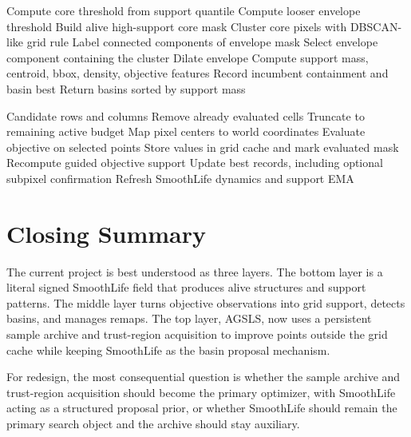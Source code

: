 \documentclass[11pt]{article}
\begin{document}
\begin{algorithm}
\caption{Current basin detection}
\begin{algorithmic}[1]
\State Compute core threshold from support quantile
\State Compute looser envelope threshold
\State Build alive high-support core mask
\State Cluster core pixels with DBSCAN-like grid rule
\State Label connected components of envelope mask
    \State Select envelope component containing the cluster
    \State Dilate envelope
    \State Compute support mass, centroid, bbox, density, objective features
    \State Record incumbent containment and basin best
\EndFor
\State Return basins sorted by support mass
\end{algorithmic}
\label{alg:basin-detection}
\end{algorithm}

\begin{algorithm}
\caption{Current objective cache update}
\begin{algorithmic}[1]
\Require Candidate rows and columns
\State Remove already evaluated cells
\State Truncate to remaining active budget
\State Map pixel centers to world coordinates
\State Evaluate objective on selected points
\State Store values in grid cache and mark evaluated mask
\State Recompute guided objective support
\State Update best records, including optional subpixel confirmation
\State Refresh SmoothLife dynamics and support EMA
\end{algorithmic}
\label{alg:objective-cache}
\end{algorithm}

\section{Closing Summary}

The current project is best understood as three layers. The bottom layer is
a literal signed SmoothLife field that produces alive structures and support
patterns. The middle layer turns objective observations into grid support,
detects basins, and manages remaps. The top layer, AGSLS, now uses a persistent
sample archive and trust-region acquisition to improve points outside the
grid cache while keeping SmoothLife as the basin proposal mechanism.

For redesign, the most consequential question is whether the sample archive
and trust-region acquisition should become the primary optimizer, with
SmoothLife acting as a structured proposal prior, or whether SmoothLife should
remain the primary search object and the archive should stay auxiliary.
\end{document}
